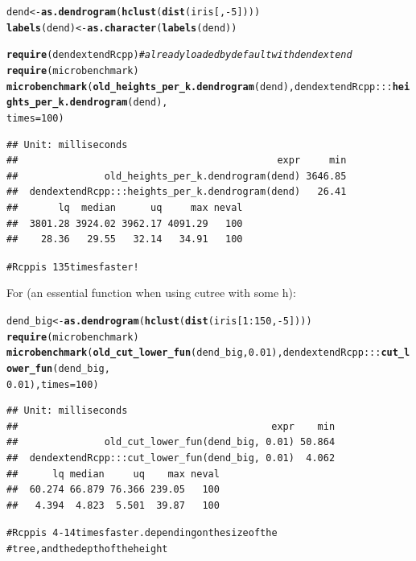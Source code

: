 \documentclass[shortnames,nojss,article]{jss}\usepackage[]{graphicx}\usepackage[]{color}
\makeatletter
\newcommand{\hlnum}[1]{\textcolor[rgb]{0.686,0.059,0.569}{#1}}%
\newcommand{\hlcom}[1]{\textcolor[rgb]{0.678,0.584,0.686}{\textit{#1}}}%
\newcommand{\hlopt}[1]{\textcolor[rgb]{0,0,0}{#1}}%
\newcommand{\hlstd}[1]{\textcolor[rgb]{0.345,0.345,0.345}{#1}}%
\newcommand{\hlkwb}[1]{\textcolor[rgb]{0.69,0.353,0.396}{#1}}%
\newcommand{\hlkwc}[1]{\textcolor[rgb]{0.333,0.667,0.333}{#1}}%
\newcommand{\hlkwd}[1]{\textcolor[rgb]{0.737,0.353,0.396}{\textbf{#1}}}%
\newenvironment{kframe}{%
 \def\at@end@of@kframe{}%
 \ifinner\ifhmode%
  \def\at@end@of@kframe{\end{minipage}}%
  \begin{minipage}{\columnwidth}%
 \fi\fi%
 \def\FrameCommand##1{\hskip\@totalleftmargin \hskip-\fboxsep
 \colorbox{shadecolor}{##1}\hskip-\fboxsep
     \hskip-\linewidth \hskip-\@totalleftmargin \hskip\columnwidth}%
 \MakeFramed {\advance\hsize-\width
   \@totalleftmargin\z@ \linewidth\hsize
   \@setminipage}}%
 {\par\unskip\endMakeFramed%
 \at@end@of@kframe}
\newenvironment{knitrout}{}{} %
\makeatother
\begin{document}
\begin{knitrout}
\color{fgcolor}\begin{kframe}
\begin{alltt}
\hlstd{dend} \hlkwb{<-} \hlkwd{as.dendrogram}\hlstd{(}\hlkwd{hclust}\hlstd{(}\hlkwd{dist}\hlstd{(iris[,} \hlopt{-}\hlnum{5}\hlstd{])))}
\hlkwd{labels}\hlstd{(dend)} \hlkwb{<-} \hlkwd{as.character}\hlstd{(}\hlkwd{labels}\hlstd{(dend)}\hlstd{)}

\hlkwd{require}\hlstd{(dendextendRcpp)}  \hlcom{# already loaded by default with dendextend}
\hlkwd{require}\hlstd{(microbenchmark)}
\hlkwd{microbenchmark}\hlstd{(}\hlkwd{old_heights_per_k.dendrogram}\hlstd{(dend), dendextendRcpp:::}\hlkwd{heights_per_k.dendrogram}\hlstd{(dend),}
    \hlkwc{times} \hlstd{=} \hlnum{100}\hlstd{)}
\end{alltt}
\begin{verbatim}
## Unit: milliseconds
##                                             expr     min
##               old_heights_per_k.dendrogram(dend) 3646.85
##  dendextendRcpp:::heights_per_k.dendrogram(dend)   26.41
##       lq  median      uq     max neval
##  3801.28 3924.02 3962.17 4091.29   100
##    28.36   29.55   32.14   34.91   100
\end{verbatim}
\begin{alltt}
# Rcpp is ~135 times faster!
\end{alltt}
\end{kframe}
\end{knitrout}



For  (an essential function when using cutree with some h):

\begin{knitrout}
\color{fgcolor}\begin{kframe}
\begin{alltt}
\hlstd{dend_big} \hlkwb{<-} \hlkwd{as.dendrogram}\hlstd{(}\hlkwd{hclust}\hlstd{(}\hlkwd{dist}\hlstd{(iris[}\hlnum{1}\hlopt{:}\hlnum{150}\hlstd{,} \hlopt{-}\hlnum{5}\hlstd{])))}
\hlkwd{require}\hlstd{(microbenchmark)}
\hlkwd{microbenchmark}\hlstd{(}\hlkwd{old_cut_lower_fun}\hlstd{(dend_big,} \hlnum{0.01}\hlstd{), dendextendRcpp:::}\hlkwd{cut_lower_fun}\hlstd{(dend_big,}
    \hlnum{0.01}\hlstd{),} \hlkwc{times} \hlstd{=} \hlnum{100}\hlstd{)}
\end{alltt}
\begin{verbatim}
## Unit: milliseconds
##                                            expr    min
##               old_cut_lower_fun(dend_big, 0.01) 50.864
##  dendextendRcpp:::cut_lower_fun(dend_big, 0.01)  4.062
##      lq median     uq    max neval
##  60.274 66.879 76.366 239.05   100
##   4.394  4.823  5.501  39.87   100
\end{verbatim}
\begin{alltt}
# Rcpp is ~4-14 times faster. depending on the size of the
# tree, and the depth of the height
\end{alltt}
\end{kframe}
\end{knitrout}
\end{document}

